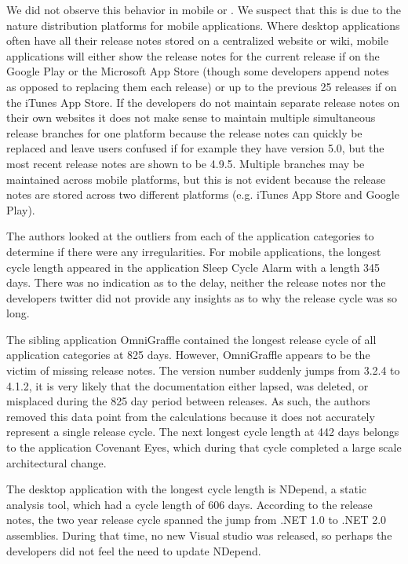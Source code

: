 \documentclass{acm_proc_article-sp}
\begin{document}
We did not observe this behavior in mobile or \sibs. We suspect that this is due to the nature distribution platforms for mobile applications.
Where desktop applications often have all their release notes stored on a centralized website or wiki, mobile applications will either show the release notes for the current release if on the Google Play or the Microsoft App Store (though some developers append notes as opposed to replacing them each release) or up to the previous 25 releases if on the iTunes App Store. 
If the developers do not maintain separate release notes on their own websites it does not make sense to maintain multiple simultaneous release branches for one platform because the release notes can quickly be replaced and leave users confused if for example they have version 5.0, but the most recent release notes are shown to be 4.9.5.
Multiple branches may be maintained across mobile platforms, but this is not evident because the release notes are stored across two different platforms (e.g. iTunes App Store and Google Play).




 The authors looked at the outliers from each of the application categories to determine if there were any irregularities.
For mobile applications, the longest cycle length appeared in the application Sleep Cycle Alarm with a length 345 days. 
There was no indication as to the delay, neither the release notes nor the developers twitter did not provide any insights as to why the release cycle was so long.

The sibling application OmniGraffle contained the longest release cycle of all application categories at 825 days. 
However, OmniGraffle appears to be the victim of missing release notes.
The version number suddenly jumps from 3.2.4 to 4.1.2, it is very likely that the documentation either lapsed, was deleted, or misplaced during the 825 day period between releases.
As such, the authors removed this data point from the calculations because it does not accurately represent a single release cycle. 
The next longest cycle length at 442 days belongs to the application Covenant Eyes, which during that cycle completed a large scale architectural change.

The desktop application with the longest cycle length is NDepend, a static analysis tool, which had a cycle length of 606 days. 
According to the release notes, the two year release cycle spanned the jump from .NET 1.0 to .NET 2.0 assemblies.
During that time, no new Visual studio was released, so perhaps the developers did not feel the need to update NDepend.
\end{document}
